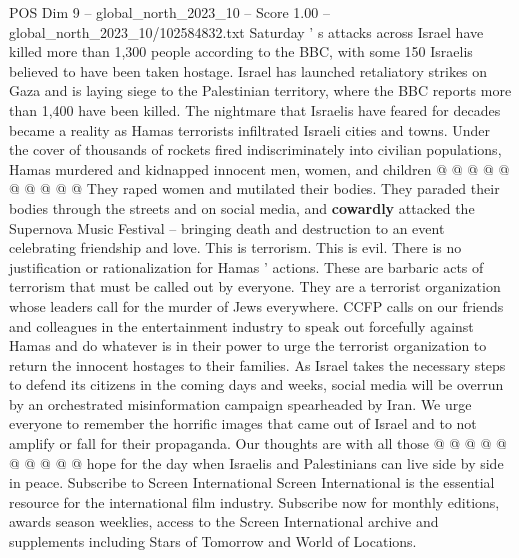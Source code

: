 \begin{textsample}{POS Dim 9 – global\_north\_2023\_10 – Score 1.00 – global\_north\_2023\_10/102584832.txt}
Saturday ' s attacks across Israel have killed more than 1,300 people according to the BBC, with some 150 Israelis believed to have been taken hostage.
Israel has launched retaliatory strikes on Gaza and is laying siege to the Palestinian territory, where the BBC reports more than 1,400 have been killed.
The nightmare that Israelis have feared for decades became a reality as Hamas terrorists infiltrated Israeli cities and towns.
Under the cover of thousands of rockets fired indiscriminately into civilian populations, Hamas murdered and kidnapped innocent men, women, and children @ @ @ @ @ @ @ @ @ @ They raped women and mutilated their bodies.
They paraded their bodies through the streets and on social media, and \textbf{cowardly} attacked the Supernova Music Festival -- bringing death and destruction to an event celebrating friendship and love.
This is terrorism.
This is evil.
There is no justification or rationalization for Hamas ' actions.
These are barbaric acts of terrorism that must be called out by everyone.
They are a terrorist organization whose leaders call for the murder of Jews everywhere.
CCFP calls on our friends and colleagues in the entertainment industry to speak out forcefully against Hamas and do whatever is in their power to urge the terrorist organization to return the innocent hostages to their families.
As Israel takes the necessary steps to defend its citizens in the coming days and weeks, social media will be overrun by an orchestrated misinformation campaign spearheaded by Iran.
We urge everyone to remember the horrific images that came out of Israel and to not amplify or fall for their propaganda.
Our thoughts are with all those @ @ @ @ @ @ @ @ @ @ hope for the day when Israelis and Palestinians can live side by side in peace.
Subscribe to Screen International Screen International is the essential resource for the international film industry.
Subscribe now for monthly editions, awards season weeklies, access to the Screen International archive and supplements including Stars of Tomorrow and World of Locations.

\end{textsample}
